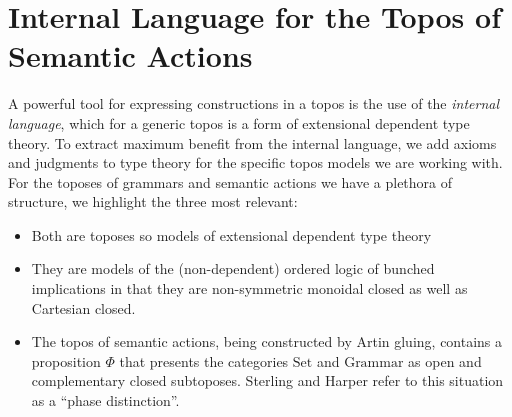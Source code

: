 \documentclass[12pt]{article}
\newcommand{\Set}{\textrm{Set}}
\newcommand{\Grammar}{\textrm{Grammar}}
\begin{document}





\section{Internal Language for the Topos of Semantic Actions}

A powerful tool for expressing constructions in a topos is the use of
the \emph{internal language}, which for a generic topos is a form of
extensional dependent type theory.
%
To extract maximum benefit from the internal language, we add axioms
and judgments to type theory for the specific topos models we are
working with.
%
For the toposes of grammars and semantic actions we have a plethora of
structure, we highlight the three most relevant:

\begin{itemize}
\item Both are toposes so models of extensional dependent type theory
\item They are models of the (non-dependent) ordered logic of bunched
  implications in that they are non-symmetric monoidal closed as well
  as Cartesian closed.
\item The topos of semantic actions, being constructed by Artin
  gluing, contains a proposition $\Phi$ that presents the categories
  $\Set$ and $\Grammar$ as open and complementary closed
  subtoposes. Sterling and Harper refer to this situation as a ``phase
  distinction''.
\end{itemize}
\end{document}
